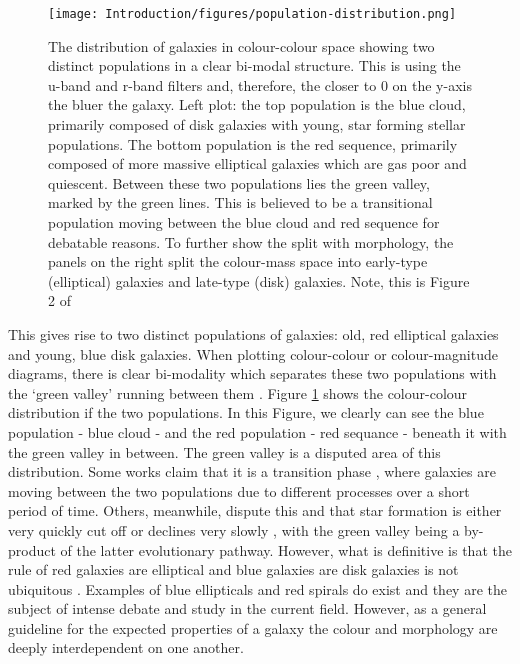 \begin{figure}
    \centering
    \texttt{[image: Introduction/figures/population-distribution.png]}
    \caption{The distribution of galaxies in colour-colour space showing two distinct populations in a clear bi-modal structure. This is using the u-band and r-band filters and, therefore, the closer to 0 on the y-axis the bluer the galaxy. Left plot: the top population is the blue cloud, primarily composed of disk galaxies with young, star forming stellar populations. The bottom population is the red sequence, primarily composed of more massive elliptical galaxies which are gas poor and quiescent. Between these two populations lies the green valley, marked by the green lines. This is believed to be a transitional population moving between the blue cloud and red sequence for debatable reasons. To further show the split with morphology, the panels on the right split the colour-mass space into early-type (elliptical) galaxies and late-type (disk) galaxies. Note, this is Figure 2 of \citet{2014MNRAS.440..889S}}
    \label{fig:blue-red-population}
\end{figure}

This gives rise to two distinct populations of galaxies: old, red elliptical galaxies and young, blue disk galaxies. When plotting colour-colour or colour-magnitude diagrams, there is clear bi-modality which separates these two populations with the `green valley' running between them \citep{2001AJ....122.1861S}. Figure \ref{fig:blue-red-population} shows the colour-colour distribution if the two populations. In this Figure, we clearly can see the blue population - blue cloud - and the red population - red sequance - beneath it with the green valley in between. The green valley is a disputed area of this distribution. Some works claim that it is a transition phase \citep{2007ApJS..173..315S, 2015MNRAS.450..435S}, where galaxies are moving between the two populations due to different processes over a short period of time. Others, meanwhile, dispute this and that star formation is either very quickly cut off or declines very slowly \citep{2014MNRAS.440..889S}, with the green valley being a by-product of the latter evolutionary pathway. However, what is definitive is that the rule of red galaxies are elliptical and blue galaxies are disk galaxies is not ubiquitous \citep{2022MNRAS.510.4126S}. Examples of blue ellipticals and red spirals do exist \citep{2009MNRAS.396..818S, 2010MNRAS.405..783M, 2022AJ....163..150K} and they are the subject of intense debate and study in the current field. However, as a general guideline for the expected properties of a galaxy the colour and morphology are deeply interdependent on one another.

